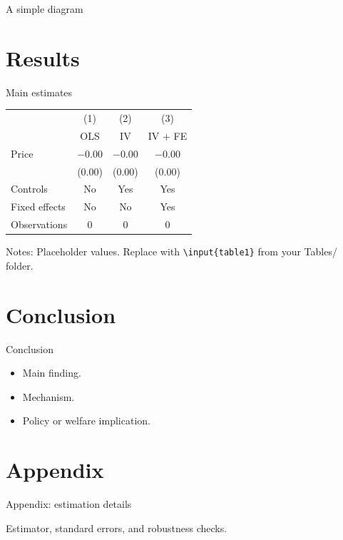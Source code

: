 \documentclass[aspectratio=169]{beamer}
\newenvironment{wideitemize}{\itemize\addtolength{\itemsep}{10pt}}{\enditemize}
\newenvironment{stepitemize}{\begin{itemize}[<+->]}{\end{itemize}}
\newenvironment{tablefootnotes}{\tiny\begin{flushleft}}{\end{flushleft}}
\begin{document}
\begin{frame}{A simple diagram}
\centering
{}
\end{frame}

\section{Results}
\begin{frame}{Main estimates}
\centering
\begin{threeparttable}
\small
\begin{tabular}{lccc}
\toprule
 & (1) & (2) & (3) \\
 & OLS & IV & IV + FE \\
\midrule
Price          & $-0.00$ & $-0.00$ & $-0.00$ \\
               & (0.00)  & (0.00)  & (0.00)  \\
Controls       & No  & Yes & Yes \\
Fixed effects  & No  & No  & Yes \\
\midrule
Observations   & 0 & 0 & 0 \\
\bottomrule
\end{tabular}
\begin{tablefootnotes}
Notes: Placeholder values. Replace with \texttt{\textbackslash input\{table1\}} from your Tables/ folder.
\end{tablefootnotes}
\end{threeparttable}
\end{frame}

\section{Conclusion}
\begin{frame}{Conclusion}
  \begin{stepitemize}
    \item Main finding.
    \item Mechanism.
    \item Policy or welfare implication.
  \end{stepitemize}
  \vspace{0.3cm}
  \centering\hyperlink{appendix_start}{}
\end{frame}

\section{Appendix}
\begin{frame}[label=appendix_start,noframenumbering]{Appendix: estimation details}
  \begin{wideitemize}
    \item Estimator, standard errors, and robustness checks.
  \end{wideitemize}
\end{frame}
\end{document}

